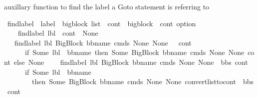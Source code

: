 \begin{isabellebody}
\begin{isamarkuptext}%
auxillary function to find the label a Goto statement is referring to%
\end{isamarkuptext}\isamarkuptrue%
\isamarkupfalse%
\ find{\isacharunderscore}{\kern0pt}label\ {\isacharcolon}{\kern0pt}{\isacharcolon}{\kern0pt}\ {\isachardoublequoteopen}label\ {\isasymRightarrow}\ bigblock\ list\ {\isasymRightarrow}\ cont\ {\isasymRightarrow}\ {\isacharparenleft}{\kern0pt}{\isacharparenleft}{\kern0pt}bigblock\ {\isacharasterisk}{\kern0pt}\ cont{\isacharparenright}{\kern0pt}\ option{\isacharparenright}{\kern0pt}{\isachardoublequoteclose}\ \isanewline
\ \ \ \ {\isachardoublequoteopen}find{\isacharunderscore}{\kern0pt}label\ lbl\ {\isacharbrackleft}{\kern0pt}{\isacharbrackright}{\kern0pt}\ cont\ {\isacharequal}{\kern0pt}\ None{\isachardoublequoteclose}\ \isanewline
\ \ {\isacharbar}{\kern0pt}\ {\isachardoublequoteopen}find{\isacharunderscore}{\kern0pt}label\ lbl\ {\isacharparenleft}{\kern0pt}{\isacharparenleft}{\kern0pt}BigBlock\ bb{\isacharunderscore}{\kern0pt}name\ cmds\ None\ None{\isacharparenright}{\kern0pt}\ {\isacharhash}{\kern0pt}\ {\isacharbrackleft}{\kern0pt}{\isacharbrackright}{\kern0pt}{\isacharparenright}{\kern0pt}\ cont\ {\isacharequal}{\kern0pt}\ \isanewline
\ \ \ \ \ \ {\isacharparenleft}{\kern0pt}if\ {\isacharparenleft}{\kern0pt}Some\ lbl\ {\isacharequal}{\kern0pt}\ bb{\isacharunderscore}{\kern0pt}name{\isacharparenright}{\kern0pt}\ then\ {\isacharparenleft}{\kern0pt}Some\ {\isacharparenleft}{\kern0pt}{\isacharparenleft}{\kern0pt}BigBlock\ bb{\isacharunderscore}{\kern0pt}name\ cmds\ None\ None{\isacharparenright}{\kern0pt}{\isacharcomma}{\kern0pt}\ cont{\isacharparenright}{\kern0pt}{\isacharparenright}{\kern0pt}\ else\ {\isacharparenleft}{\kern0pt}None{\isacharparenright}{\kern0pt}{\isacharparenright}{\kern0pt}{\isachardoublequoteclose}\ \isanewline
\ \ {\isacharbar}{\kern0pt}\ {\isachardoublequoteopen}find{\isacharunderscore}{\kern0pt}label\ lbl\ {\isacharparenleft}{\kern0pt}{\isacharparenleft}{\kern0pt}BigBlock\ bb{\isacharunderscore}{\kern0pt}name\ cmds\ None\ None{\isacharparenright}{\kern0pt}\ {\isacharhash}{\kern0pt}\ bbs{\isacharparenright}{\kern0pt}\ cont\ {\isacharequal}{\kern0pt}\ \isanewline
\ \ \ \ \ \ {\isacharparenleft}{\kern0pt}if\ {\isacharparenleft}{\kern0pt}Some\ lbl\ {\isacharequal}{\kern0pt}\ bb{\isacharunderscore}{\kern0pt}name{\isacharparenright}{\kern0pt}\ \isanewline
\ \ \ \ \ \ \ \ then\ {\isacharparenleft}{\kern0pt}Some\ {\isacharparenleft}{\kern0pt}{\isacharparenleft}{\kern0pt}BigBlock\ bb{\isacharunderscore}{\kern0pt}name\ cmds\ None\ None{\isacharparenright}{\kern0pt}{\isacharcomma}{\kern0pt}\ {\isacharparenleft}{\kern0pt}convert{\isacharunderscore}{\kern0pt}list{\isacharunderscore}{\kern0pt}to{\isacharunderscore}{\kern0pt}cont\ {\isacharparenleft}{\kern0pt}\ bbs{\isacharparenright}{\kern0pt}\ cont{\isacharparenright}{\kern0pt}{\isacharparenright}{\kern0pt}{\isacharparenright}{\kern0pt}\ \isanewline

\end{isabellebody}
